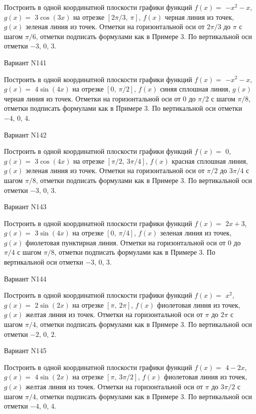 \documentclass[11pt]{report}
\begin{document}
Построить в одной координатной плоскости графики функций $f(x) = $
    $- x^{2} - x$, $g(x) = $
    $3 \cos{\left(3 x \right)}$ на 
    отрезке $\left[ 2 \pi / 3, \  \pi\right]$, $f(x)$ черная 
    линия из точек, $g(x)$ зеленая линия из точек. 
    Отметки на горизонтальной оси от $2 \pi / 3$ до $\pi$ с 
    шагом $\pi / 6$, отметки подписать формулами как в Примере 3.  
    По вертикальной оси отметки $-3$, 0, $3$.

Вариант N141

Построить в одной координатной плоскости графики функций $f(x) = $
    $- x^{2} - x$, $g(x) = $
    $4 \sin{\left(4 x \right)}$ на 
    отрезке $\left[ 0, \  \pi / 2\right]$, $f(x)$ синяя 
    сплошная линия, $g(x)$ черная линия из точек. 
    Отметки на горизонтальной оси от $0$ до $\pi / 2$ с 
    шагом $\pi / 8$, отметки подписать формулами как в Примере 3.  
    По вертикальной оси отметки $-4$, 0, $4$.

Вариант N142

Построить в одной координатной плоскости графики функций $f(x) = $
    $0$, $g(x) = $
    $3 \cos{\left(4 x \right)}$ на 
    отрезке $\left[ \pi / 2, \  3 \pi / 4\right]$, $f(x)$ красная 
    сплошная линия, $g(x)$ зеленая линия из точек. 
    Отметки на горизонтальной оси от $\pi / 2$ до $3 \pi / 4$ с 
    шагом $\pi / 8$, отметки подписать формулами как в Примере 3.  
    По вертикальной оси отметки $-3$, 0, $3$.

Вариант N143

Построить в одной координатной плоскости графики функций $f(x) = $
    $2 x + 3$, $g(x) = $
    $3 \sin{\left(4 x \right)}$ на 
    отрезке $\left[ 0, \  \pi / 4\right]$, $f(x)$ зеленая 
    линия из точек, $g(x)$ фиолетовая пунктирная линия. 
    Отметки на горизонтальной оси от $0$ до $\pi / 4$ с 
    шагом $\pi / 8$, отметки подписать формулами как в Примере 3.  
    По вертикальной оси отметки $-3$, 0, $3$.

Вариант N144

Построить в одной координатной плоскости графики функций $f(x) = $
    $x^{2}$, $g(x) = $
    $2 \sin{\left(2 x \right)}$ на 
    отрезке $\left[ \pi, \  2 \pi\right]$, $f(x)$ фиолетовая 
    линия из точек, $g(x)$ желтая линия из точек. 
    Отметки на горизонтальной оси от $\pi$ до $2 \pi$ с 
    шагом $\pi / 4$, отметки подписать формулами как в Примере 3.  
    По вертикальной оси отметки $-2$, 0, $2$.

Вариант N145

Построить в одной координатной плоскости графики функций $f(x) = $
    $4 - 2 x$, $g(x) = $
    $4 \sin{\left(2 x \right)}$ на 
    отрезке $\left[ \pi, \  3 \pi / 2\right]$, $f(x)$ фиолетовая 
    линия из точек, $g(x)$ желтая линия из точек. 
    Отметки на горизонтальной оси от $\pi$ до $3 \pi / 2$ с 
    шагом $\pi / 4$, отметки подписать формулами как в Примере 3.  
    По вертикальной оси отметки $-4$, 0, $4$.
\end{document}
